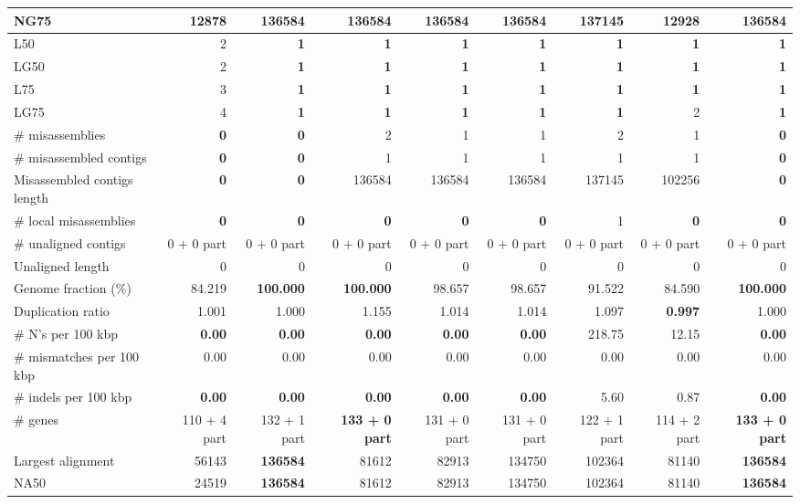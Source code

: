 \documentclass[12pt]{article}
\begin{document}
\begin{table}[h!]
\begin{center}
{\begin{tabular}{|l*{8}{|r}|}
NG75 & 12878 & 136584 & 136584 & 136584 & 136584 & {\bf 137145} & 12928 & 136584 \\ \hline
L50 & 2 & {\bf 1} & {\bf 1} & {\bf 1} & {\bf 1} & {\bf 1} & {\bf 1} & {\bf 1} \\ \hline
LG50 & 2 & {\bf 1} & {\bf 1} & {\bf 1} & {\bf 1} & {\bf 1} & {\bf 1} & {\bf 1} \\ \hline
L75 & 3 & {\bf 1} & {\bf 1} & {\bf 1} & {\bf 1} & {\bf 1} & {\bf 1} & {\bf 1} \\ \hline
LG75 & 4 & {\bf 1} & {\bf 1} & {\bf 1} & {\bf 1} & {\bf 1} & 2 & {\bf 1} \\ \hline
\# misassemblies & {\bf 0} & {\bf 0} & 2 & 1 & 1 & 2 & 1 & {\bf 0} \\ \hline
\# misassembled contigs & {\bf 0} & {\bf 0} & 1 & 1 & 1 & 1 & 1 & {\bf 0} \\ \hline
Misassembled contigs length & {\bf 0} & {\bf 0} & 136584 & 136584 & 136584 & 137145 & 102256 & {\bf 0} \\ \hline
\# local misassemblies & {\bf 0} & {\bf 0} & {\bf 0} & {\bf 0} & {\bf 0} & 1 & {\bf 0} & {\bf 0} \\ \hline
\# unaligned contigs & 0 + 0 part & 0 + 0 part & 0 + 0 part & 0 + 0 part & 0 + 0 part & 0 + 0 part & 0 + 0 part & 0 + 0 part \\ \hline
Unaligned length & 0 & 0 & 0 & 0 & 0 & 0 & 0 & 0 \\ \hline
Genome fraction (\%) & 84.219 & {\bf 100.000} & {\bf 100.000} & 98.657 & 98.657 & 91.522 & 84.590 & {\bf 100.000} \\ \hline
Duplication ratio & 1.001 & 1.000 & 1.155 & 1.014 & 1.014 & 1.097 & {\bf 0.997} & 1.000 \\ \hline
\# N's per 100 kbp & {\bf 0.00} & {\bf 0.00} & {\bf 0.00} & {\bf 0.00} & {\bf 0.00} & 218.75 & 12.15 & {\bf 0.00} \\ \hline
\# mismatches per 100 kbp & 0.00 & 0.00 & 0.00 & 0.00 & 0.00 & 0.00 & 0.00 & 0.00 \\ \hline
\# indels per 100 kbp & {\bf 0.00} & {\bf 0.00} & {\bf 0.00} & {\bf 0.00} & {\bf 0.00} & 5.60 & 0.87 & {\bf 0.00} \\ \hline
\# genes & 110 + 4 part & 132 + 1 part & {\bf 133 + 0 part} & 131 + 0 part & 131 + 0 part & 122 + 1 part & 114 + 2 part & {\bf 133 + 0 part} \\ \hline
Largest alignment & 56143 & {\bf 136584} & 81612 & 82913 & 134750 & 102364 & 81140 & {\bf 136584} \\ \hline
NA50 & 24519 & {\bf 136584} & 81612 & 82913 & 134750 & 102364 & 81140 & {\bf 136584} \\ \hline

\end{tabular}}
\end{center}
\end{table}
\end{document}
